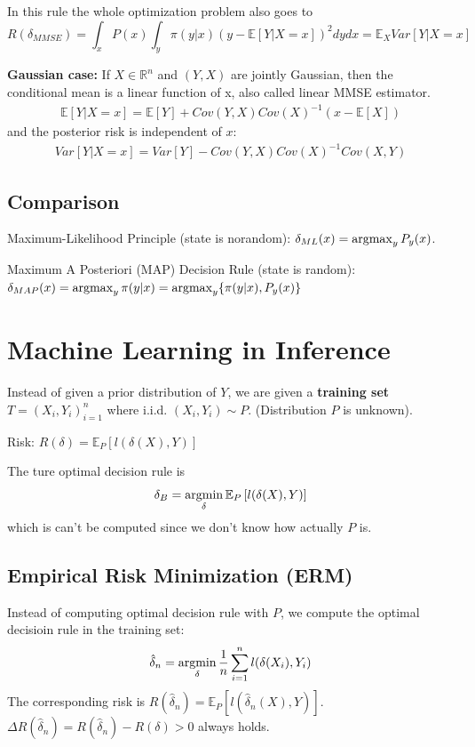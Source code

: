 \documentclass[11pt,a4paper]{article}
\newcommand{\argmax}{\operatornamewithlimits{argmax}}
\newcommand{\argmin}{\operatornamewithlimits{argmin}}
\begin{document}
In this rule the whole optimization problem also goes to
$$R(\delta_{MMSE})=\int_x P(x)\int_y \pi(y|x) (y-\mathbb{E}\left[Y|X=x\right])^2 dy dx=\mathbb{E}_X Var\left[Y|X=x\right]$$

\textbf{Gaussian case:}
If $X\in \mathbb{R}^n$ and $(Y,X)$ are jointly Gaussian, then the conditional mean is a linear function of x, also called linear MMSE estimator.
\begin{equation}
    \begin{aligned}
        \mathbb{E}\left[Y|X=x\right]=\mathbb{E}[Y]+Cov(Y,X)Cov(X)^{-1}(x-\mathbb{E}[X])
    \end{aligned}
    \nonumber
\end{equation}
and the posterior risk is independent of $x$:
\begin{equation}
    \begin{aligned}
        Var\left[Y|X=x\right]=Var[Y]-Cov(Y,X)Cov(X)^{-1}Cov(X,Y)
    \end{aligned}
    \nonumber
\end{equation}
\subsection{Comparison}
Maximum-Likelihood Principle (state is norandom): $\delta_{ML}(x)=\argmax_y P_y(x)$.

Maximum A Posteriori (MAP) Decision Rule (state is random): $\delta_{MAP}(x)=\argmax_y \pi(y|x)=\argmax_y \{\pi(y|x),P_y(x)\}$


\section{Machine Learning in Inference}
Instead of given a prior distribution of $Y$, we are given a \textbf{training set} $T=(X_i,Y_i)_{i=1}^n$ where i.i.d. $(X_i,Y_i)\sim P$. (Distribution $P$ is unknown).

Risk: $R(\delta)=\mathbb{E}_P\left[l(\delta(X),Y)\right]$

The ture optimal decision rule is $$\delta_B=\argmin_\delta \mathbb{E}_P\left[l(\delta(X),Y)\right]$$
which is can't be computed since we don't know how actually $P$ is.

\subsection{Empirical Risk Minimization (ERM)}
Instead of computing optimal decision rule with $P$, we compute the optimal decisioin rule in the training set:
$$\hat{\delta}_n=\argmin_\delta \frac{1}{n}\sum_{i=1}^nl(\delta(X_i),Y_i)$$
The corresponding risk is $R(\hat{\delta}_n)=\mathbb{E}_P\left[l(\hat{\delta}_n(X),Y)\right]$. $\Delta R(\hat{\delta}_n)=R(\hat{\delta}_n)- R(\delta)>0$ always holds.
\end{document}
